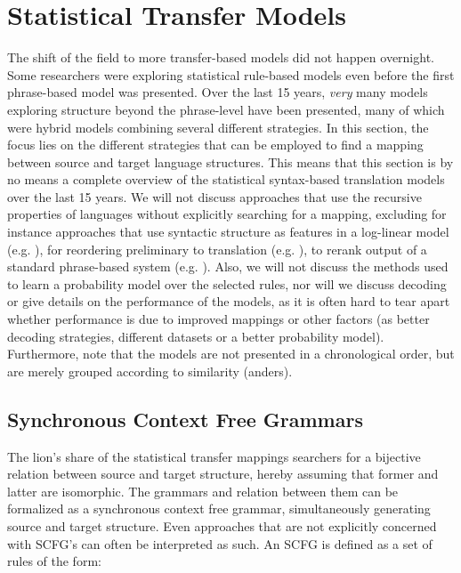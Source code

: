 \documentclass{report}
\theoremstyle{definition}
\theoremstyle{plain}
\begin{document}
\section{Statistical Transfer Models}

The shift of the field to more transfer-based models did not happen overnight. Some researchers were exploring statistical rule-based models even before the first phrase-based model was presented. Over the last 15 years, \textit{very} many models exploring structure beyond the phrase-level have been presented, many of which were hybrid models combining several different strategies. In this section, the focus lies on the different strategies that can be employed to find a mapping between source and target language structures. This means that this section is by no means a complete overview of the statistical syntax-based translation models over the last 15 years. We will not discuss approaches that use the recursive properties of languages without explicitly searching for a mapping, excluding for instance approaches that use syntactic structure as features in a log-linear model (e.g. \cite{cherry2013improved,liu2010semantic}), for reordering preliminary to translation (e.g. \cite{khalilov2012statistical}), to rerank output of a standard phrase-based system (e.g. \cite{och2004smorgasbord}). Also, we will not discuss the methods used to learn a probability model over the selected rules, nor will we discuss decoding or give details on the performance of the models, as it is often hard to tear apart whether performance is due to improved mappings or other factors (as better decoding strategies, different datasets or a better probability model). Furthermore, note that the models are not presented in a chronological order, but are merely grouped according to similarity (anders).

\subsection{Synchronous Context Free Grammars}
The lion's share of the statistical transfer mappings searchers for a bijective relation between source and target structure, hereby assuming that former and latter are isomorphic. The grammars and relation between them can be formalized as a synchronous context free grammar, simultaneously generating source and target structure. Even approaches that are not explicitly concerned with SCFG's can often be interpreted as such. An SCFG is defined as a set of rules of the form:
\end{document}
